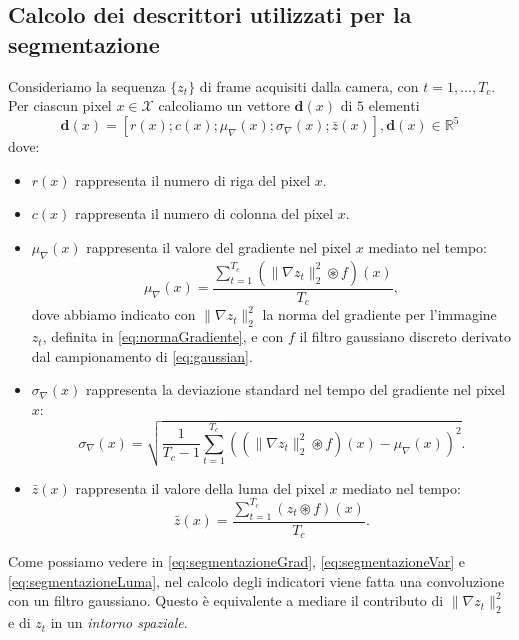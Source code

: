 \subsection{Calcolo dei descrittori utilizzati per la segmentazione}
\label{descrittori}
Consideriamo la sequenza $\{z_t\}$ di frame acquisiti dalla camera, con $t=1,\dots,T_{c}$.
Per ciascun pixel $x\in\mathcal{X}$ calcoliamo un vettore $\textbf{d}(x)$ di $5$ elementi
\begin{equation}
	\label{eq:featureVector}
	\textbf{d}(x)=\left[r(x);c(x);\mu_{\nabla}(x);\sigma_{\nabla}(x);\bar{z}(x)\right], \textbf{d}(x) \in \mathbb{R}^5
\end{equation}
dove:
\begin{itemize}
	\item $r(x)$ rappresenta il numero di riga del pixel $x$.
	\item $c(x)$ rappresenta il numero di colonna del pixel $x$.
	\item $\mu_{\nabla}(x)$ rappresenta il valore del gradiente nel pixel $x$ mediato nel tempo:
	\begin{equation}
	\label{eq:segmentazioneGrad}
		\mu_{\nabla}(x) = \frac{\sum_{t=1}^{T_c}(\|\nabla z_t\|_2^2 \circledast f)(x)}{T_c},
	\end{equation}
	dove abbiamo indicato con $\|\nabla z_t\|_2^2$ la norma del gradiente per l'immagine $z_t$, definita in \eqref{eq:normaGradiente}, e con $f$ il filtro gaussiano discreto derivato dal campionamento di \eqref{eq:gaussian}.
	\item $\sigma_{\nabla}(x)$ rappresenta la deviazione standard nel tempo del gradiente nel pixel $x$:
	\begin{equation}
		\label{eq:segmentazioneVar}
		\sigma_{\nabla}(x)=\sqrt{\frac{1}{T_c - 1}\sum_{t=1}^{T_c}\left(\left(\|\nabla z_t\|_2^2 \circledast f\right)(x)-\mu_{\nabla}(x)\right)^2}.
	\end{equation}
	\item $\bar{z}(x)$ rappresenta il valore della luma del pixel $x$ mediato nel tempo:
	\begin{equation}
	\label{eq:segmentazioneLuma}
	\bar{z}(x)=\frac{\sum_{t=1}^{T_c}( z_t \circledast f)(x)}{T_c}.
	\end{equation}
\end{itemize}
Come possiamo vedere in \eqref{eq:segmentazioneGrad}, \eqref{eq:segmentazioneVar} e \eqref{eq:segmentazioneLuma}, nel calcolo degli indicatori viene fatta una convoluzione con un filtro gaussiano.
Questo \`e equivalente a mediare il contributo di $\|\nabla z_t\|_2^2$ e di $z_t$ in un \textit{intorno spaziale}.\\
